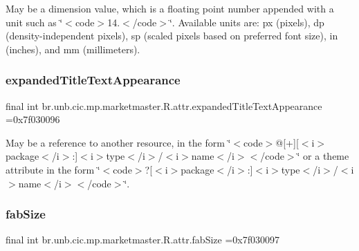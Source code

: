 May be a dimension value, which is a floating point number appended with a unit such as \char`\"{}$<$code$>$14.\+5sp$<$/code$>$\char`\"{}. Available units are\+: px (pixels), dp (density-\/independent pixels), sp (scaled pixels based on preferred font size), in (inches), and mm (millimeters). \mbox{\label{classbr_1_1unb_1_1cic_1_1mp_1_1marketmaster_1_1R_1_1attr_aaa99eba7eef61c94803c14e314ae7cec}} 
\subsubsection{\texorpdfstring{expanded\+Title\+Text\+Appearance}{expandedTitleTextAppearance}}
{\footnotesize\ttfamily final int br.\+unb.\+cic.\+mp.\+marketmaster.\+R.\+attr.\+expanded\+Title\+Text\+Appearance =0x7f030096\hspace{0.3cm}{\ttfamily [static]}}

May be a reference to another resource, in the form \char`\"{}$<$code$>$@\mbox{[}+\mbox{]}\mbox{[}$<$i$>$package$<$/i$>$\+:\mbox{]}$<$i$>$type$<$/i$>$/$<$i$>$name$<$/i$>$$<$/code$>$\char`\"{} or a theme attribute in the form \char`\"{}$<$code$>$?\mbox{[}$<$i$>$package$<$/i$>$\+:\mbox{]}$<$i$>$type$<$/i$>$/$<$i$>$name$<$/i$>$$<$/code$>$\char`\"{}. \mbox{\label{classbr_1_1unb_1_1cic_1_1mp_1_1marketmaster_1_1R_1_1attr_a0b71837f81ce46711a626af8b0b06149}} 
\subsubsection{\texorpdfstring{fab\+Size}{fabSize}}
{\footnotesize\ttfamily final int br.\+unb.\+cic.\+mp.\+marketmaster.\+R.\+attr.\+fab\+Size =0x7f030097\hspace{0.3cm}{\ttfamily [static]}}

